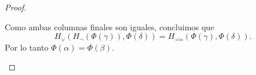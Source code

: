 \documentclass[12pt]{article}
\theoremstyle{remark}
\newcommand{\1}{\mathbbm{1}}
\begin{document}
\begin{proof}
\begin{itemize}
            Como ambas columnas finales son iguales, concluimos que $$H_{\lor}(H_{\neg}(\Phi(\gamma)), \Phi(\delta)) = H_{\implies}(\Phi(\gamma), \Phi(\delta)).$$
            Por lo tanto $\Phi(\alpha) = \Phi(\beta)$.

        \end{itemize}
        

        
    \end{proof}

    
    
\end{document}
